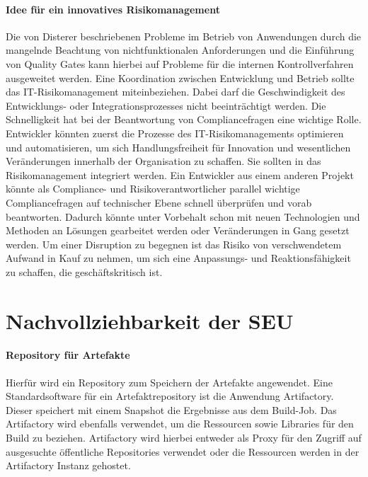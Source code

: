 \paragraph{Idee für ein innovatives Risikomanagement}
Die von Disterer beschriebenen Probleme im Betrieb von Anwendungen durch die mangelnde Beachtung von nichtfunktionalen Anforderungen und die Einführung von Quality Gates \cite{mci/Disterer2011} kann hierbei auf Probleme für die internen Kontrollverfahren ausgeweitet werden. Eine Koordination zwischen Entwicklung und Betrieb sollte das IT-Risikomanagement miteinbeziehen. Dabei darf die Geschwindigkeit des Entwicklungs- oder Integrationsprozesses nicht beeinträchtigt werden. Die Schnelligkeit hat bei der Beantwortung von Compliancefragen eine wichtige Rolle. Entwickler könnten zuerst die Prozesse des IT-Risikomanagements optimieren und automatisieren, um sich Handlungsfreiheit für Innovation und wesentlichen Veränderungen innerhalb der Organisation zu schaffen. Sie sollten in das Risikomanagement integriert werden. Ein Entwickler aus einem anderen Projekt könnte als Compliance- und Risikoverantwortlicher parallel wichtige Compliancefragen auf technischer Ebene schnell überprüfen und vorab beantworten. Dadurch könnte unter Vorbehalt schon mit neuen Technologien und Methoden an Lösungen gearbeitet werden oder Veränderungen in Gang gesetzt werden. Um einer Disruption zu begegnen ist das Risiko von verschwendetem Aufwand in Kauf zu nehmen, um sich eine Anpassungs- und Reaktionsfähigkeit zu schaffen, die geschäftskritisch ist.


\section{Nachvollziehbarkeit der SEU}



\paragraph{Repository für Artefakte}
Hierfür wird ein Repository zum Speichern der Artefakte angewendet. Eine Standardsoftware für ein Artefaktrepository ist die Anwendung Artifactory. Dieser speichert mit einem Snapshot die Ergebnisse aus dem Build-Job. Das Artifactory wird ebenfalls verwendet, um die Ressourcen sowie Libraries für den Build zu beziehen. Artifactory wird hierbei entweder als Proxy für den Zugriff auf ausgesuchte öffentliche Repositories verwendet oder die Ressourcen werden in der Artifactory Instanz gehostet.

